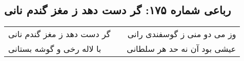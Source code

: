 \begin{center}
\section*{رباعی شماره ۱۷۵: گر دست دهد ز مغز گندم نانی}
\label{sec:sh175}
\begin{longtable}{l p{0.5cm} r}
گر دست دهد ز مغز گندم نانی
&&
وز می دو منی ز گوسفندی رانی
\\
با لاله رخی و گوشه بستانی
&&
عیشی بود آن نه حد هر سلطانی
\\
\end{longtable}
\end{center}
